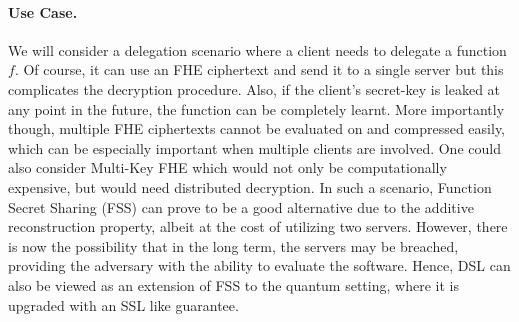 \paragraph{Use Case.} We will consider a delegation scenario where a
client needs to delegate a function $f$. Of course, it can use an
FHE ciphertext and send it to a single server but this complicates
the decryption procedure. Also, if the client's secret-key is leaked
at any point in the future, the function can be completely learnt.
More importantly though, multiple FHE ciphertexts cannot be
evaluated on and compressed easily, which can be especially
important when multiple clients are involved. One could also
consider Multi-Key FHE which would not only be computationally
expensive, but would need distributed decryption. In such a
scenario, Function Secret Sharing (FSS) can prove to be a  good
alternative due to the additive reconstruction property, albeit at
the cost of utilizing two servers.  However, there is now the
possibility that in the long term, the servers may be breached,
providing the adversary with the ability to evaluate the software.
Hence, DSL can also be viewed as an extension of FSS to the quantum
setting, where it is upgraded with an SSL like guarantee. 

